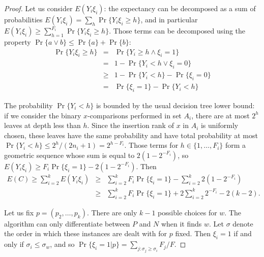 \begin{proof}
Let us consider $E(Y_i\xi_i)$: the expectancy can be decomposed as a
sum of probabilities $E(Y_i\xi_i){=}\sum_h\Pr\{Y_i\xi_i{\geq}h\}$, and
in particular
$E(Y_i\xi_i){\geq}\sum_{h=1}^{F_i}\Pr\{Y_i\xi_i{\geq}h\}$.
%
Those terms can be decomposed using the property
$\Pr\{a{\vee}b\}\leq\Pr\{a\}{+}\Pr\{b\}$:
\begin{eqnarray}
\Pr \{ Y_i\xi_i\geq h \} 
&  =    & \Pr \{ Y_i\geq h \wedge \xi_i=1 \}   \nonumber\\
&  =    &  1 - \Pr \{ Y_i< h \vee \xi_i=0 \} \nonumber\\
&  \geq &  1 - \Pr \{ Y_i< h \} - \Pr \{ \xi_i=0 \} \nonumber\\
&  =    &  \Pr \{ \xi_i=1 \} -\Pr \{ Y_i< h \} \label{equation1}
\end{eqnarray}

The probability $\Pr\{Y_i<h\}$ is bounded by the usual decision
tree lower bound: if we consider the binary $x$-comparisons performed
 in set $A_i$, there are at most $2^{h}$ leaves at
depth less than $h$.
%
Since the insertion rank of $x$ in $A_i$ is uniformly chosen, these
leaves have the same probability and have total probability at most
$\Pr\{Y_i{<}h\}{\leq}{2^{h}/(2n_i+1)}{=}2^{h-F_i}$.
%
Those terms for $h\in\{1,\ldots,F_i\}$ form a geometric sequence whose
sum is equal to $2(1-2^{-F_i})$,
%
so $E(Y_i\xi_i) \geq F_i \Pr\{\xi_i=1\} - 2(1-2^{-F_i})$.
%
Then 
\begin{eqnarray}
E(C)\geq\sum_{i=2}^k E(Y_i \xi_i)
&\geq& \sum_{i=2}^k F_i \Pr\{\xi_i=1\}
      - \sum_{i=2}^k 2(1-2^{-F_i})
\nonumber\\ 
&\geq& \sum_{i=2}^k F_i \Pr\{\xi_i=1\}
      + 2\sum_{i=2}^k 2^{-F_i}  - 2(k-2).
\label{equation2}
\end{eqnarray}


Let us fix $p=(p_2, \ldots,p_k)$.
%
There are only $k-1$ possible choices for $w$.
%
The algorithm can only differentiate between $P$ and $N$ when it finds
$w$.
%
Let $\sigma$ denote the order in which these instances are dealt with
for $p$ fixed.
%
Then $\xi_i=1$ if and only if $\sigma_i\leq\sigma_w$, and so
 $\Pr\{\xi_i=1|p\}=\sum_{j:\sigma_j\geq\sigma_i}{F_j /  F}$.


\end{proof}
